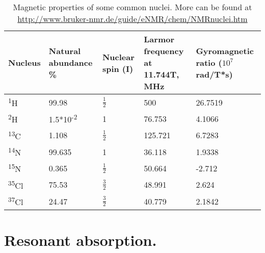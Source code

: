 \documentclass[a4paper, 12pt]{article}
\begin{document}
\begin{table}[ht]
\caption{Magnetic properties of some common nuclei. More can be found at \url{http://www.bruker-nmr.de/guide/eNMR/chem/NMRnuclei.htm} }
\label{tab:mag_properties}
\centering
\begin{tabular}{m{1.5cm} m{1.5cm} m{1.5cm} m{3cm} m{3cm}}
\hline\hline
Nucleus & Natural abundance \% & Nuclear spin (I) & Larmor frequency at 11.744T, MHz & Gyromagnetic ratio ($10^7$ rad/T*s) \\
\hline
\textsuperscript{1}H & 99.98 & $\frac{1}{2}$ & 500 & 26.7519 \\
\textsuperscript{2}H & 1.5*10\textsuperscript{-2} & 1 & 76.753 & 4.1066 \\
\textsuperscript{13}C & 1.108 & $\frac{1}{2}$ & 125.721 & 6.7283 \\
\textsuperscript{14}N & 99.635 & 1 & 36.118 & 1.9338 \\
\textsuperscript{15}N & 0.365 &  $\frac{1}{2}$ & 50.664 & -2.712 \\
\textsuperscript{35}Cl & 75.53 &  $\frac{3}{2}$ & 48.991 & 2.624 \\
\textsuperscript{37}Cl & 24.47 &  $\frac{3}{2}$ & 40.779 & 2.1842 \\
\hline
\end{tabular}
\end{table}

\section{Resonant absorption.} \label{Res_absorbtion}
\end{document}
